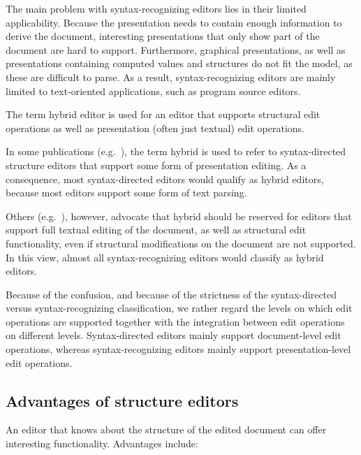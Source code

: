 The main problem with syntax-recognizing editors lies in their limited applicability. Because the presentation needs to contain enough information to derive the document, interesting presentations that only show part of the document are hard to support. Furthermore, graphical presentations, as well as presentations containing computed values and structures do not fit the model, as these are difficult to parse. As a result, syntax-recognizing editors are mainly limited to text-oriented applications, such as program source editors.


The term hybrid editor is used for an editor that supports structural edit operations as well as presentation (often just textual) edit operations. 

In some publications (e.g.~\cite{teitelbaum81progSynth, minor90editing}), the term hybrid is used to refer to syntax-directed structure editors that support some form of presentation editing. As a consequence, most syntax-directed editors would qualify as hybrid editors, because most editors support some form of text parsing.

Others (e.g.~\cite{ballance92pan, koorn92gse}), however, advocate that hybrid should be reserved for editors that support full textual editing of the document, as well as structural edit functionality, even if structural modifications on the document are not supported. In this view, almost all syntax-recognizing editors would classify as hybrid editors. 

Because of the confusion, and because of the strictness of the syntax-directed versus syntax-recognizing classification, we rather regard the levels on which edit operations are supported together with the integration between edit operations on different levels. Syntax-directed editors mainly support document-level edit operations, whereas syntax-recognizing editors mainly support presentation-level edit operations.


%								
\subsection{Advantages of structure editors}

An editor that knows about the structure of the edited document can offer interesting functionality. Advantages include:

